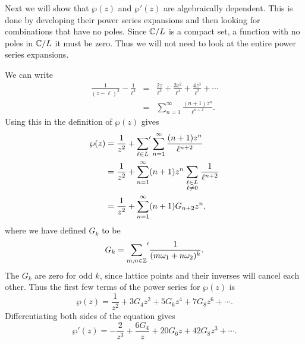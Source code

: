 Next we will show that $\wp(z)$ and $\wp'(z)$ are algebraically
dependent.  This is done by developing their power series expansions and
then looking for combinations that have no poles.  Since $\mathbb{C}/L$ is a
compact set, a function with no poles in $\mathbb{C}/L$ it must be zero.  Thus
we will not need to look at the entire power series expansions.

We can write
\begin{eqnarray*}
\frac{1}{(z-\ell)^2}- \frac{1}{\ell^2} &
=& \frac{2 z}{\ell^3} + \frac{3 z^2}{\ell^4} + \frac{4 z^3}{\ell^5} +
\cdots\\
&=& \sum_{n=1}^{\infty} \frac{(n+1)z^n}{\ell^{n+2}}.
\end{eqnarray*}
Using this in the definition of $\wp(z)$ gives
\[
\begin{aligned}
\wp(z) &=
\frac{1}{z^2} + {\sum_{\ell \in L}}'\sum_{n=1}^{\infty} \frac{(n+1)z^n}{\ell^{n+2}} \\
&= \frac{1}{z^2} + \sum_{n=1}^{\infty} (n+1) z^n 
\sum_{\scriptstyle\ell \in L \atop\scriptstyle \ell \not=0} \frac{1}{\ell^{n+2}}\\
&= \frac{1}{z^2} + \sum_{n=1}^{\infty} (n+1) G_{n+2} z^n,
\end{aligned}
\]
where we have defined $G_k$ to be
\[
G_k = {\sum_{m,n \in \mathbb{Z}}}' \frac{1}{(m \omega_1 + n \omega_2)^k}.
\]
The $G_k$ are zero for odd $k$, since lattice points and their 
inverses will cancel each other.  Thus the first few terms of the power
series for $\wp(z)$ is
\[
\wp(z) = \frac{1}{z^2} + 3 G_4 z^2 + 5 G_6 z^4 + 7 G_8 z^6 + \cdots.
\]
Differentiating both sides of the equation gives
\[
\wp'(z) = -\frac{2}{z^3} + \frac{6 G_4}{z} + 20 G_6 z + 42 G_8 z^3 +
\cdots.
\]

